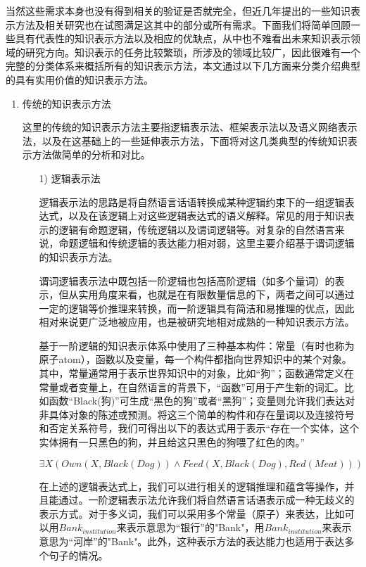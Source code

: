 当然这些需求本身也没有得到相关的验证是否就完全，但近几年提出的一些知识表示方法及相关研究也在试图满足这其中的部分或所有需求。下面我们将简单回顾一些具有代表性的知识表示方法以及相应的优缺点，从中也不难看出未来知识表示领域的研究方向。知识表示的任务比较繁琐，所涉及的领域比较广，因此很难有一个完整的分类体系来概括所有的知识表示方法，本文通过以下几方面来分类介绍典型的具有实用价值的知识表示方法。

\begin{enumerate}
\item {传统的知识表示方法}

这里的传统的知识表示方法主要指逻辑表示法、框架表示法以及语义网络表示法，以及在这基础上的一些延伸表示方法，下面将对这几类典型的传统知识表示方法做简单的分析和对比。

\begin{enumerate}
\item[1)] 逻辑表示法

逻辑表示法的思路是将自然语言话语转换成某种逻辑约束下的一组逻辑表达式，以及在该逻辑上对这些逻辑表达式的语义解释。常见的用于知识表示的逻辑有命题逻辑，传统逻辑以及谓词逻辑等。对复杂的自然语言来说，命题逻辑和传统逻辑的表达能力相对弱，这里主要介绍基于谓词逻辑的知识表示方法。

谓词逻辑表示法中既包括一阶逻辑也包括高阶逻辑（如多个量词）的表示，但从实用角度来看，也就是在有限数量信息的下，两者之间可以通过一定的逻辑等价推理来转换，而一阶逻辑具有简洁和易推理的优点，因此相对来说更广泛地被应用，也是被研究地相对成熟的一种知识表示方法。

基于一阶逻辑的知识表示体系中使用了三种基本构件：常量（有时也称为原子atom），函数以及变量，每一个构件都指向世界知识中的某个对象。其中，常量通常用于表示世界知识中的对象，比如“狗”；函数通常定义在常量或者变量上，在自然语言的背景下，“函数”可用于产生新的词汇。比如函数“Black(狗)”可生成“黑色的狗”或者“黑狗”；变量则允许我们表达对非具体对象的陈述或预测。将这三个简单的构件和存在量词以及连接符号和否定关系符号，我们可得出以下的表达式用于表示“存在一个实体，这个实体拥有一只黑色的狗，并且给这只黑色的狗喂了红色的肉。”

$$ 
\exists X(Own(X, Black(Dog))\land Feed(X, Black(Dog), Red(Meat))) 
$$


在上述的逻辑表达式上，我们可以进行相关的逻辑推理和蕴含等操作，并且能通过。一阶逻辑表示法允许我们将自然语言话语表示成一种无歧义的表示方式。对于多义词，我们可以采用多个常量（原子）来表达，比如可以用$Bank_{institution}$来表示意思为“银行”的"Bank"，用$Bank_{institution}$来表示意思为“河岸”的"Bank"。此外，这种表示方法的表达能力也适用于表达多个句子的情况。


\end{enumerate}
\end{enumerate}
